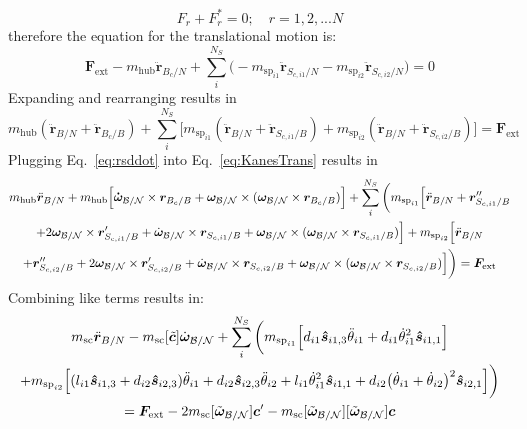 \documentclass[paper]{aiaaNew}
\begin{document}
\begin{equation}
F_r + F^*_r = 0;\quad r = 1, 2, ... N
\label{eq:KanesEq}
\end{equation}
therefore the equation for the translational motion is:
\begin{equation}
\bm F_{\text{ext}} -m_{\text{hub}} \ddot{\bm r}_{B_c/N} + \sum\limits_{i}^{N_S} \Big( -m_{\text{sp}_{i1}} \ddot{\bm{r}}_{S_{c,{i1}}/N} -m_{\text{sp}_{i2}} \ddot{\bm{r}}_{S_{c,{i2}}/N}\Big) = 0
\end{equation}
Expanding and rearranging results in
\begin{equation}
m_{\text{hub}} (\ddot{\bm r}_{B/N} + \ddot{\bm r}_{B_c/B})  + \sum\limits_{i}^{N_S} \Big[ m_{\text{sp}_{i1}} (\ddot{\bm r}_{B/N} + \ddot{\bm{r}}_{S_{c,{i1}}/B}) + m_{\text{sp}_{i2}} (\ddot{\bm r}_{B/N} + \ddot{\bm{r}}_{S_{c,{i2}}/B})\Big] = \bm F_{\text{ext}}
\label{eq:KanesTrans}
\end{equation}
Plugging Eq.~\eqref{eq:rsddot} into Eq.~\eqref{eq:KanesTrans} results in
\begin{multline}
m_{\text{hub}} \ddot{\bm r}_{B/N} + m_{\text{hub}}\Big[\bm{\dot{\omega}}_{\cal B/N} \times \bm{r}_{B_c/B} + \bm\omega_{\cal B/N} \times (\bm\omega_{\cal B/N} \times \bm{r}_{B_c/B})\Big]
+ \sum\limits_{i}^{N_S} \bigg( m_{\text{sp}_{i1}} \Big[\ddot{\bm r}_{B/N} + \bm{r}''_{S_{c,i1}/B} \\
+ 2 \bm\omega_{\cal B/N} \times \bm{r}'_{S_{c,i1}/B} +  \dot{\bm\omega}_{\cal B/N} \times \bm{r}_{S_{c,i1}/B} + \bm\omega_{\cal B/N} \times (\bm\omega_{\cal B/N} \times \bm{r}_{S_{c,i1}/B})\Big]
+ m_{\text{sp}_{i2}} \Big[\ddot{\bm r}_{B/N} \\
+ \bm{r}''_{S_{c,i2}/B} + 2 \bm\omega_{\cal B/N} \times \bm{r}'_{S_{c,i2}/B} +  \dot{\bm\omega}_{\cal B/N} \times \bm{r}_{S_{c,i2}/B} + \bm\omega_{\cal B/N} \times (\bm\omega_{\cal B/N} \times \bm{r}_{S_{c,i2}/B})\Big]\bigg) = \bm F_{\text{ext}}
\end{multline}
Combining like terms results in:
\begin{multline}
m_{\text{sc}} \ddot{\bm r}_{B/N} -m_{\textnormal{sc}} [\tilde{\bm{c}}]\dot{\bm\omega}_{\cal B/N} 
+ \sum\limits_{i}^{N_S} \bigg( m_{\text{sp}_{i1}} \Big[d_{i1} \bm{\hat{s}}_{i1,3} \ddot{\theta}_{i1} + d_{i1} \dot{\theta}_{i1}^2 \bm{\hat{s}}_{i1,1}\Big] \\
+ m_{\text{sp}_{i2}} \Big[(l_{i1} \bm{\hat{s}}_{i1,3} + d_{i2} \bm{\hat{s}}_{i2,3}) \ddot{\theta}_{i1} + d_{i2} \bm{\hat{s}}_{i2,3} \ddot{\theta}_{i2} + l_{i1} \dot{\theta}_{i1}^2 \bm{\hat{s}}_{i1,1} + d_{i2}\big(\dot{\theta}_{i1} + \dot{\theta}_{i2}\big)^2\bm{\hat{s}}_{i2,1} \Big]\bigg) \\
= \bm F_{\text{ext}} - 2 m_{\textnormal{sc}}[\tilde{\bm\omega}_{\cal B/N}]\bm{c}' - m_{\textnormal{sc}} [\tilde{\bm\omega}_{\cal B/N}][\tilde{\bm\omega}_{\cal B/N}]\bm{c} 
\end{multline}
\end{document}
